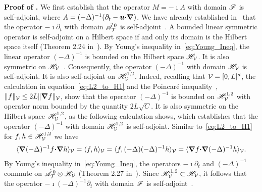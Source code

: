 \documentclass[amsa]{ipart}
\begin{document}
\textbf{Proof of .}\hspace{1ex}
%
We first establish that the operator $M=-\imath A$ with domain
$\mathscr{F}$ is
self-adjoint, where $A=(-\Delta)^{-1}(\partial_t-\boldsymbol{u}\mbox{\boldmath${\cdot}$}\mbox{\boldmath${\nabla}$})$. We have
already established 
in~ that the operator $-\imath\partial_t$ with domain
$\tilde{\mathscr{A}}^{\,0}_{\mathcal{T}}$ is self-adjoint~\cite{Stone:64}. A bounded
linear symmetric operator is self-adjoint on a Hilbert space if and
only its domain is the Hilbert space itself (Theorem 2.24
in~\cite{Stone:64}). By Young's inequality in~\eqref{eq:Young_Ineq},
the linear operator $(-\Delta)^{-1}$ is bounded on the Hilbert space
$\mathscr{H}_{\mathcal{V}}$. It is also symmetric on
$\mathscr{H}_{\mathcal{V}}$~\cite{Stakgold:BVP:2000,Folland:95:PDEs}. Consequently,
the operator $(-\Delta)^{-1}$ with domain $\mathscr{H}_{\mathcal{V}}$ is
self-adjoint. It is also self-adjoint on $\mathscr{H}^{1,2}_{\mathcal{V}}$. Indeed,
recalling that $\mathcal{V}=[0,L]^d$, the calculation in
equation~\eqref{eq:L2_to_H1} and the Poincar{\'e} 
inequality~\cite{McOwen:2003:PDE}, $\|f\|_{\mathcal{V}}\leq2L\|\mbox{\boldmath${\nabla}$} f\|_{\mathcal{V}}$, show that the
operator $(-\Delta)^{-1}$ is bounded on $\mathscr{H}^{1,2}_{\mathcal{V}}$ with operator norm
bounded by the quantity $2L\sqrt{C}$. It is also
symmetric on the Hilbert space $\mathscr{H}^{1,2}_{\mathcal{V}}$, as the following
calculation shows, which establishes that the operator $(-\Delta)^{-1}$
with domain $\mathscr{H}^{1,2}_{\mathcal{V}}$ is self-adjoint. Similar
to~\eqref{eq:L2_to_H1} for $f,h\in\mathscr{H}^{1,2}_{\mathcal{V}}$ we have
% 
\begin{align}
  \langle\bnabla(-\Delta)^{-1}f\bcdot\bnabla h\rangle_{\Vc}
               =\langle f,h\rangle_{\Vc}
               =\langle f,(-\Delta)(-\Delta)^{-1}h\rangle_{\Vc}
               =\langle\bnabla f\bcdot\bnabla(-\Delta)^{-1}h\rangle_{\Vc}.
\end{align}
%
By Young's inequality
in~\eqref{eq:Young_Ineq}, the operators $-\imath\partial_t$ and $(-\Delta)^{-1}$
commute on
$\tilde{\mathscr{A}}^{\,0}_{\mathcal{T}}\otimes\mathscr{H}_{\mathcal{V}}$ (Theorem 2.27
in~\cite{Folland:99:RealAnalysis}). Since $\mathscr{H}^{1,2}_{\mathcal{V}}\subset\mathscr{H}_{\mathcal{V}}$, it 
follows that the operator $-\imath(-\Delta)^{-1}\partial_t$ with domain 
$\mathscr{F}$ is self-adjoint~\cite{Stone:64}. 
\end{document}
